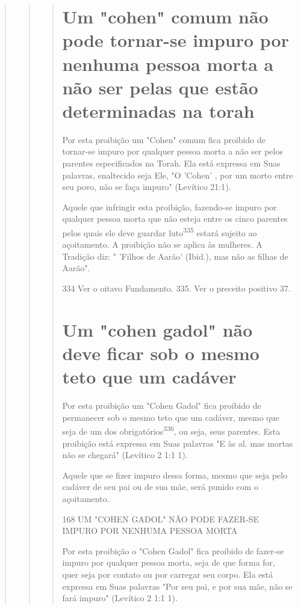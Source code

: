 \begin{quote}
\begin{quote}
\begin{quote}
\section{Um "cohen" comum não pode tornar-se impuro por nenhuma pessoa morta
a não ser pelas que estão determinadas na torah}

Por esta proibição um "Cohen" comum fica proibido de tornar-se impuro
por qualquer pessoa morta a não ser pelos parentes especificados na
Torah. Ela está expressa em Suas palavras, enaltecido seja Ele, "O
'Cohen' , por um morto entre seu povo, não se faça impuro" (Levítico
21:1).

Aquele que infringir esta proibição, fazendo-se impuro por qualquer
pessoa morta que não esteja entre os cinco parentes pelos quais ele deve
guar­dar luto\textsuperscript{335} estará sujeito ao açoitamento. A
proibição não se aplica às mulhe­res. A Tradição diz: " 'Filhos de
Aarão' (Ibid.), mas não as filhas de Aarão".

334 Ver o oitavo Fundamento. 335. Ver o preceito positivo 37.


\section{Um "cohen gadol" não deve ficar sob o mesmo teto que um cadáver}

Por esta proibição um "Cohen Gadol" fica proibido de permanecer sob o
mesmo teto que um cadáver, mesmo que seja de um dos
obrigatórios\textsuperscript{336}, ou seja, seus parentes. Esta
proibição está expressa em Suas palavras "E às al­. mas mortas não se
chegará" (Levítico 2 1:1 1).

Aquele que se fizer impuro dessa forma, mesmo que seja pelo cadá­ver de
seu pai ou de sua mãe, será punido com o açoitamento.

168 UM "COHEN GADOL" NÃO PODE FAZER-SE IMPURO POR NENHUMA PESSOA MORTA

Por esta proibição o "Cohen Gadol" fica proibido de fazer-se impu­ro por
qualquer pessoa morta, seja de que forma for, quer seja por contato ou
por carregar seu corpo. Ela está expressa em Suas palavras "Por seu pai,
e por sua mãe, não se fará impuro" (Levítico 2 1:1 1).


\end{quote}
\end{quote}
\end{quote}
